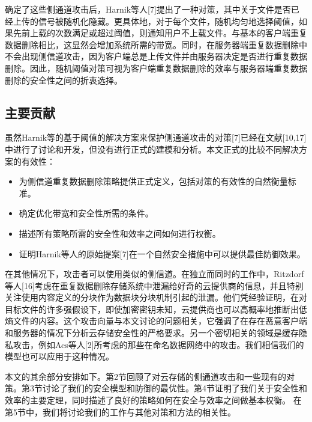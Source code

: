 确定了这些侧通道攻击后，Harnik等人[7]提出了一种对策，其中关于文件是否已经上传的信号被随机化隐藏。更具体地，对于每个文件，随机均匀地选择阈值，如果先前上载的次数满足或超过阈值，则通知用户不上载文件。与基本的客户端重复数据删除相比，这显然会增加系统所需的带宽。同时，在服务器端重复数据删除中不会出现侧信道攻击，因为客户端总是上传文件并由服务器决定是否进行重复数据删除。因此，随机阈值对策可视为客户端重复数据删除的效率与服务器端重复数据删除的安全性之间的折衷选择。

\subsection{主要贡献}

虽然Harnik等的基于阈值的解决方案来保护侧通道攻击的对策[7]已经在文献[10,17]中进行了讨论和开发，但没有进行正式的建模和分析。本文正式的比较不同解决方案的有效性：

\begin{itemize}
    \item 为侧信道重复数据删除策略提供正式定义，包括对策的有效性的自然衡量标准。
    \item 确定优化带宽和安全性所需的条件。
    \item 描述所有策略所需的安全性和效率之间如何进行权衡。
    \item 证明Harnik等人的原始提案[7]在一个自然安全措施中可以提供最佳防御效果。
\end{itemize}


在其他情况下，攻击者可以使用类似的侧信道。在独立而同时的工作中，Ritzdorf等人[16]考虑在重复数据删除存储系统中泄漏给好奇的云提供商的信息，并且特别关注使用内容定义的分块作为数据块分块机制引起的泄漏。他们凭经验证明，在对目标文件的许多强假设下，即使加密密钥未知，云提供商也可以高概率地推断出低熵文件的内容。这个攻击向量与本文讨论的问题相关，它强调了在存在恶意客户端和服务器的情况下分析云存储安全性的严格要求。另一个密切相关的领域是缓存隐私攻击，例如Acs等人[2]所考虑的那些在命名数据网络中的攻击。我们相信我们的模型也可以应用于这种情况。

本文的其余部分安排如下。第2节回顾了对云存储的侧通道攻击和一些现有的对策。第3节讨论了我们的安全模型和防御的最优性。第4节证明了我们关于安全性和效率的主要定理，同时描述了良好的策略如何在安全与效率之间做基本权衡。 在第5节中，我们将讨论我们的工作与其他对策和方法的相关性。

